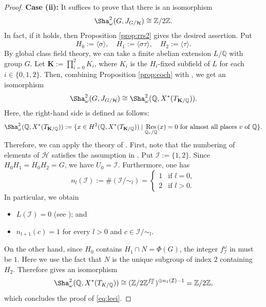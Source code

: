 \documentclass[12pt]{amsart}
\theoremstyle{plain}
\theoremstyle{definition}
\numberwithin{thm}{section}
\numberwithin{equation}{section}
\newcommand{\Z}{\mathbb{Z}}
\newcommand{\Q}{\mathbb{Q}}
\newcommand{\bK}{\mathbf{K}}
\newcommand{\cH}{\mathcal{H}}
\newcommand{\cI}{\mathcal{I}}
\DeclareMathOperator{\Res}{Res}
\begin{document}
\begin{proof}
\textbf{Case (ii): }It suffices to prove that there is an isomorphism
\begin{equation}\label{eq:leei}
\Sha_{\omega}^{2}(G,J_{G/\cH})\cong \Z/2\Z. 
\end{equation}
In fact, if it holds, then Proposition \ref{prop:rrs2} gives the desired assertion. Put
\begin{equation*}
H_{0}:=\langle \sigma \rangle,\quad H_{1}:=\langle \sigma \tau \rangle,\quad H_{2}:=\langle \tau \rangle. 
\end{equation*}
By global class field theory, we can take a finite abelian extension $L/\Q$ with group $G$. Let $\bK:=\prod_{i=0}^{2}K_{i}$, where $K_{i}$ is the $H_{i}$-fixed subfield of $L$ for each $i\in \{0,1,2\}$. Then, combining Proposition \ref{prop:coch} with \cite[Lemma 3.3]{BayerFluckiger2020}, we get an isomorphism
\begin{equation*}
    \Sha_{\omega}^{2}(G,J_{G/\cH})\cong \Sha_{\omega}^{2}(\Q,X^{*}(T_{\bK/\Q})). 
\end{equation*}
Here, the right-hand side is defined as follows: 
\begin{equation*}
    \Sha_{\omega}^{2}(\Q,X^{*}(T_{\bK/\Q})):=\{x\in H^{2}(\Q,X^{*}(T_{\bK/\Q}))\mid \Res_{\Q_{v}/\Q}(x)=0\text{ for almost all places $v$ of $\Q$}\}. 
\end{equation*}
Therefore, we can apply the theory of \cite{Lee2022}. 
First, note that the numbering of elements of $\cH$ satisfies the assumption in \cite[p.~8, l.~6]{Lee2022}. Put $\cI:=\{1,2\}$. Since $H_{0}H_{1}=H_{0}H_{2}=G$, we have $U_{0}=\cI$. Furthermore, one has
\begin{equation*}
n_{l}(\cI):=\#(\cI/\sim_{l})=
\begin{cases}
1&\text{if }l=0,\\
2&\text{if }l>0. 
\end{cases}
\end{equation*}
In particular, we obtain 
\begin{itemize}
\item $L(\cI)=0$ (see \cite[p.~17, Section 5, l.~17--18]{Lee2022}); and 
\item $n_{l+1}(c)=1$ for every $l>0$ and $c\in \cI/\sim_{l}$. 
\end{itemize}
On the other hand, since $H_{0}$ contains $H_{1}\cap N=\Phi(G)$, the integer $f_{\cI}^{\omega}$ in \cite[p.~18, l.10--12]{Lee2022} must be $1$. Here we use the fact that $N$ is the unique subgroup of index $2$ containing $H_{2}$. Therefore \cite[Corollary 6.3 (1)]{Lee2022} gives an isomorphism
\begin{equation*}
\Sha_{\omega}^{2}(\Q,X^{*}(T_{K/\Q}))\cong (\Z/2\Z^{f_{\cI}^{\omega}})^{\oplus n_{1}(\cI)-1}=\Z/2\Z, 
\end{equation*}
which concludes the proof of \eqref{eq:leei}.


\end{proof}
\end{document}
